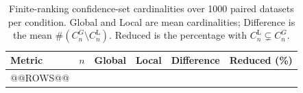 \begin{table}[htbp]
\centering
\caption[Finite-ranking confidence-set cardinalities]{Finite-ranking confidence-set cardinalities over 1000 paired datasets
per condition. Global and Local are mean cardinalities; Difference is
the mean $\#(C_n^G\setminus C_n^{\mathrm L})$. Reduced is the percentage
with $C_n^{\mathrm L}\subsetneq C_n^G$.}
\label{tab:ranking-cardinalities}
\begin{tabular}{@{}lrrrrr@{}}
\hline
Metric & $n$ & Global & Local & Difference & Reduced (\%) \\
\hline
@@ROWS@@
\end{tabular}
\end{table}
